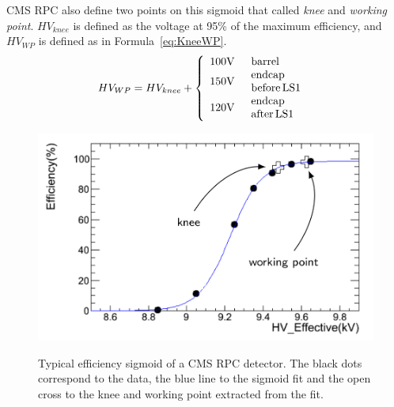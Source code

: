 \endgroup
	
	CMS RPC also define two points on this sigmoid that called \textit{knee} and \textit{working point}. $HV_{knee}$ is defined as the voltage at 95\% of the maximum efficiency, and $HV_{WP}$ is defined as in Formula~\ref{eq:KneeWP}.
	\begin{equation}
	\label{eq:KneeWP}
	HV_{WP} = HV_{knee} + \left\{\begin{array}{l l}100\mathrm{V} & \begin{array}{l}\mathrm{barrel}\end{array}\\ 150\mathrm{V} & \begin{array}{l}\mathrm{endcap}\\ \mathrm{before\,LS1}\end{array}\\ 120\mathrm{V} & \begin{array}{l}\mathrm{endcap}\\ \mathrm{after\,LS1}\end{array}\\ \end{array}\right.
	\end{equation}
	
\begingroup\setlength{\intextsep}{0pt}\setlength{\columnsep}{15pt}
	
	\begin{figure}
		\centering
		\includegraphics[width = \linewidth]{fig/chapt3/Eff_sigmoid.png}\\
		\caption{\label{fig:Sigmoid} Typical efficiency sigmoid of a CMS RPC detector. The black dots correspond to the data, the blue line to the sigmoid fit and the open cross to the knee and working point extracted from the fit.}
	\end{figure}
	
